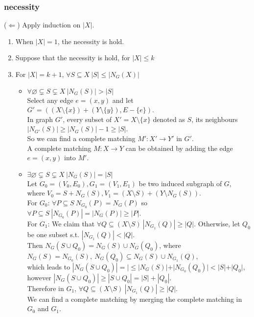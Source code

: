 \documentclass{article}
\begin{document}
\subsubsection{necessity}
($\Leftarrow$)\quad
Apply induction on $|X|$.
\begin{enumerate}
	\item When $|X|=1$, the necessity is hold.
	\item Suppose that the necessity is hold, for $|X|\leq k$
	\item For $|X|=k+1$, $\forall S\subseteq X\ |S|\leq |N_G(X)|$
	      \begin{itemize}
		      \item $\forall \varnothing\subsetneq S\subsetneq X\ |N_G(S)|>|S|$\\
		            Select any edge $e=(x,y)$ and let $G'=((X\setminus\{x\})+(Y\setminus\{y\}),E-\{e\})$.\\
		            In graph $G'$, every subset of $X'=X\setminus \{x\}$ denoted as $S$, its neighbours $|N_{G'}(S)|\geq |N_{G}(S)|-1\geq |S|$.\\
		            So we can find a complete matching  $M':X'\to Y'$ in $G'$.\\
		            A complete matching $M:X\to Y$ can be obtained by adding the edge $e=(x,y)$ into $M'$.
		      \item $\exists \varnothing\subsetneq S\subsetneq X\ |N_G(S)|=|S|$\\
		            Let $G_0=(V_0,E_0),G_1=(V_1,E_1)$ be two induced subgraph of $G$, where $V_0=S+N_G(S),V_1=(X\setminus S)+ (Y\setminus N_G(S))$.\\
		            For $G_0$: $\forall P\subseteq S\ N_{G_0}(P)=N_{G}(P)$ so $\forall P\subseteq S\ |N_{G_0}(P)|=|N_{G}(P)|\geq |P|$.\\
		            For $G_1$: We claim that $\forall Q\subseteq (X\setminus S)\ |N_{G_1}(Q)|\geq |Q|$.
		            Otherwise, let $Q_0$ be one subset s.t. $|N_{G_1}(Q)|<|Q|$.\\
		            Then $N_{G}(S\cup Q_0)=N_{G}(S)\cup N_{G}(Q_0)$, where $N_{G}(S)=N_{G_0}(S),\ N_{G}(Q_0)\subseteq N_{G}(S)\cup N_{G_1}(Q)$,\\
		            which leads to $|N_{G}(S\cup Q_0)|=|\leq |N_G(S)|+|N_{G_0}(Q_0)| < |S|+|Q_0|$, however $|N_{G}(S\cup Q_0)|\geq |S\cup Q_0|=|S|+|Q_0|$.\\
		            Therefore in $G_1$, $\forall Q\subseteq (X\setminus S)\ |N_{G_1}(Q)|\geq |Q|$.\\
		            We can find a complete matching by merging the complete matching in $G_0$ and $G_1$.
	      \end{itemize}
\end{enumerate}
\end{document}
